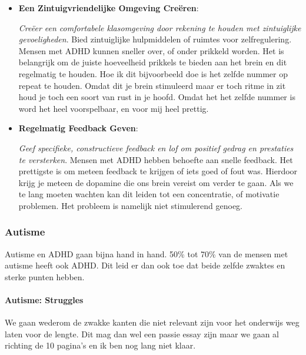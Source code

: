 \documentclass{article}
\begin{document}
\begin{itemize}
                        \item \textbf{Een Zintuigvriendelijke Omgeving Creëren}: 
                            
                            \textit{Creëer een comfortabele klasomgeving door rekening te houden met zintuiglijke gevoeligheden}. Bied zintuiglijke hulpmiddelen of ruimtes voor zelfregulering. Mensen met ADHD kunnen sneller over, of onder prikkeld worden. Het is belangrijk om de juiste hoeveelheid prikkels te bieden aan het brein en dit regelmatig te houden. Hoe ik dit bijvoorbeeld doe is het zelfde nummer op repeat te houden. Omdat dit je brein stimuleerd maar er toch ritme in zit houd je toch een soort van rust in je hoofd. Omdat het het zelfde nummer is word het heel voorspelbaar, en voor mij heel prettig.

                        \item \textbf{Regelmatig Feedback Geven}: 

                            \textit{Geef specifieke, constructieve feedback en lof om positief gedrag en prestaties te versterken}. Mensen met ADHD hebben behoefte aan snelle feedback. Het prettigste is om meteen feedback te krijgen of iets goed of fout was. Hierdoor krijg je meteen de dopamine die ons brein vereist om verder te gaan. Als we te lang moeten wachten kan dit leiden tot een concentratie, of motivatie problemen. Het probleem is namelijk niet stimulerend genoeg.

                    \end{itemize}
            
            \subsubsection{Autisme}

                Autisme en ADHD gaan bijna hand in hand. 50\% tot 70\% van de mensen met autisme heeft ook ADHD\cite{ADHD-en-autisme-overlap}. Dit leid er dan ook toe dat beide zelfde zwaktes en sterke punten hebben.
                
                \bigskip\noindent\paragraph{Autisme: Struggles}

                    We gaan wederom de zwakke kanten die niet relevant zijn voor het onderwijs weg laten voor de lengte. Dit mag dan wel een passie essay zijn maar we gaan al richting de 10 pagina's en ik ben nog lang niet klaar.
                    
\end{document}
